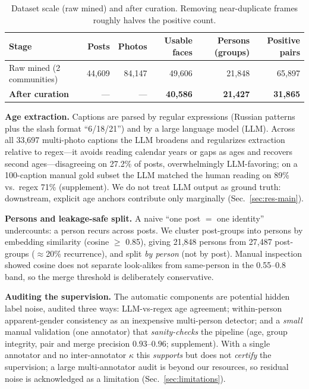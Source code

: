 \documentclass[letterpaper]{article} %
\begin{document}
\begin{table}[t]
\centering
\small
\begin{tabular}{@{}lrrrrr@{}}
\toprule
Stage & Posts & Photos & Usable faces & Persons (groups) & Positive pairs \\
\midrule
Raw mined (2 communities) & 44{,}609 & 84{,}147 & 49{,}606 & 21{,}848 & 65{,}897 \\
\textbf{After curation} & --- & --- & \textbf{40{,}586} & \textbf{21{,}427} & \textbf{31{,}865} \\
\bottomrule
\end{tabular}
\caption{Dataset scale (raw mined) and after curation. Removing near-duplicate frames roughly halves the positive count.}
\label{tab:scale}
\end{table}

\textbf{Age extraction.} Captions are parsed by regular expressions (Russian patterns plus the slash format ``6/18/21'') and by a large language model (LLM). Across all 33{,}697 multi-photo captions the LLM broadens and regularizes extraction relative to regex---it avoids reading calendar years or gaps as ages and recovers second ages---disagreeing on 27.2\% of posts, overwhelmingly LLM-favoring; on a 100-caption manual gold subset the LLM matched the human reading on 89\% vs.\ regex 71\% (supplement). We do not treat LLM output as ground truth: downstream, explicit age anchors contribute only marginally (Sec.~\ref{sec:res-main}).

\textbf{Persons and leakage-safe split.} A naive ``one post $=$ one identity'' undercounts: a person recurs across posts. We cluster post-groups into persons by embedding similarity (cosine $\geq$ 0.85), giving 21{,}848 persons from 27{,}487 post-groups ($\approx$20\% recurrence), and split \emph{by person} (not by post). Manual inspection showed cosine does not separate look-alikes from same-person in the 0.55--0.8 band, so the merge threshold is deliberately conservative.

\textbf{Auditing the supervision.} The automatic components are potential hidden label noise, audited three ways: LLM-vs-regex age agreement; within-person apparent-gender consistency as an inexpensive multi-person detector; and a \emph{small} manual validation (one annotator) that \emph{sanity-checks} the pipeline (age, group integrity, pair and merge precision $0.93$--$0.96$; supplement). With a single annotator and no inter-annotator $\kappa$ this \emph{supports} but does not \emph{certify} the supervision; a large multi-annotator audit is beyond our resources, so residual noise is acknowledged as a limitation (Sec.~\ref{sec:limitations}).
\end{document}
